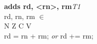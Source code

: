 


\begin{instructionblock}{\imagewidth}%
    \textbf{adds rd, <rn>, rm}\hfill\textit{T1}\\
    rd, rn, rm $\in$ \baseregisters\\
    {N Z C V}\\
    rd = rn + rm; \textit{or} rd += rm;
\end{instructionblock}

